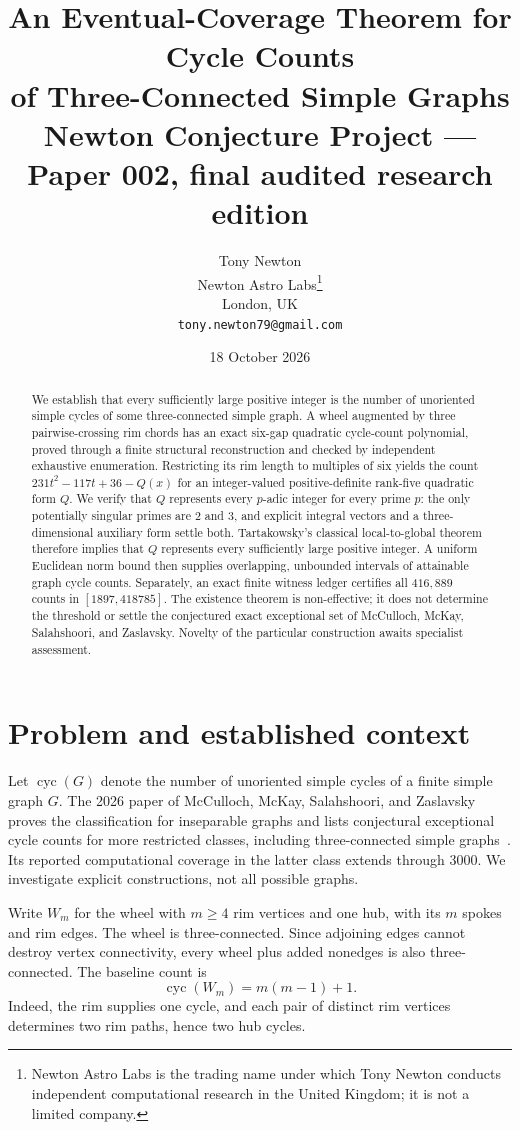 \documentclass[9pt,a4paper,twocolumn]{extarticle}
\title{An Eventual-Coverage Theorem for Cycle Counts\\ of Three-Connected Simple Graphs\\\large Newton Conjecture Project --- Paper 002, final audited research edition}
\author{Tony Newton\\\small Newton Astro Labs\thanks{Newton Astro Labs is the trading name under which Tony Newton conducts independent computational research in the United Kingdom; it is not a limited company.}\\\small London, UK\\\small \texttt{tony.newton79@gmail.com}}
\date{18 October 2026}
\newcommand{\cyc}{\operatorname{cyc}}
\begin{document}
\maketitle
\begin{abstract}
We establish that every sufficiently large positive integer is the number of unoriented simple cycles of some three-connected simple graph. A wheel augmented by three pairwise-crossing rim chords has an exact six-gap quadratic cycle-count polynomial, proved through a finite structural reconstruction and checked by independent exhaustive enumeration. Restricting its rim length to multiples of six yields the count $231t^2-117t+36-Q(x)$ for an integer-valued positive-definite rank-five quadratic form $Q$. We verify that $Q$ represents every $p$-adic integer for every prime $p$: the only potentially singular primes are $2$ and $3$, and explicit integral vectors and a three-dimensional auxiliary form settle both. Tartakowsky's classical local-to-global theorem therefore implies that $Q$ represents every sufficiently large positive integer. A uniform Euclidean norm bound then supplies overlapping, unbounded intervals of attainable graph cycle counts. Separately, an exact finite witness ledger certifies all $416{,}889$ counts in $[1897,418785]$. The existence theorem is non-effective; it does not determine the threshold or settle the conjectured exact exceptional set of McCulloch, McKay, Salahshoori, and Zaslavsky. Novelty of the particular construction awaits specialist assessment.
\end{abstract}
\section{Problem and established context}
Let $\cyc(G)$ denote the number of unoriented simple cycles of a finite simple graph $G$. The 2026 paper of McCulloch, McKay, Salahshoori, and Zaslavsky proves the classification for inseparable graphs and lists conjectural exceptional cycle counts for more restricted classes, including three-connected simple graphs~\cite{MMSZ}. Its reported computational coverage in the latter class extends through $3000$. We investigate explicit constructions, not all possible graphs.

Write $W_m$ for the wheel with $m\geq4$ rim vertices and one hub, with its $m$ spokes and rim edges. The wheel is three-connected. Since adjoining edges cannot destroy vertex connectivity, every wheel plus added nonedges is also three-connected. The baseline count is
\begin{equation}\label{eq:wheel}
\cyc(W_m)=m(m-1)+1.
\end{equation}
Indeed, the rim supplies one cycle, and each pair of distinct rim vertices determines two rim paths, hence two hub cycles.
\end{document}

